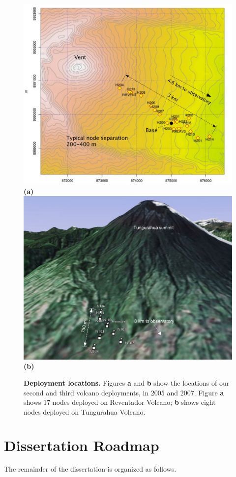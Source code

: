 \begin{figure}[]
\begin{center}
\includegraphics[width=1.0\hsize]{./5-evaluation/figs/pics/reventador-map.pdf}\\
\textbf{(a)}\\
\includegraphics[width=1.0\hsize]{./lance/figs/deploy/deployment-map.pdf}\\
\textbf{(b)}
\end{center}
\caption{{\bf Deployment locations.}
Figures \textbf{a} and \textbf{b} show the locations of our second and third volcano
deployments, in 2005 and 2007. Figure \textbf{a} shows 17 nodes deployed on Reventador
Volcano; \textbf{b} shows eight nodes deployed on Tungurahua Volcano.}
\label{fig-deployment-maps}
\end{figure}


\section{Dissertation Roadmap}

The remainder of the dissertation is organized as follows.

